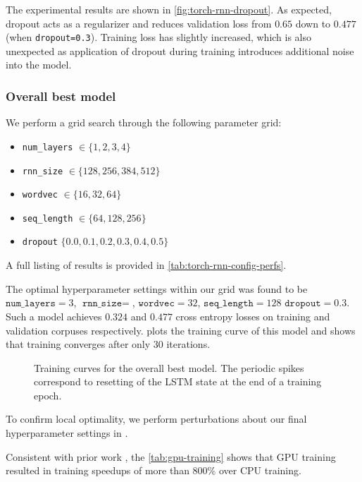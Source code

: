The experimental results are shown in \cref{fig:torch-rnn-dropout}. As
expected, dropout acts as a regularizer and reduces validation loss from $0.65$
down to $0.477$ (when \texttt{dropout=0.3}). Training loss has slightly
increased, which is also unexpected as application of dropout during training
introduces additional noise into the model.

\subsubsection{Overall best model}\label{sec:overall-best-model}

We perform a grid search through the following parameter grid:
\begin{itemize}
  \item \texttt{num\_layers} $\in \{1,2,3,4\}$
  \item \texttt{rnn\_size} $\in \{128, 256, 384, 512\}$
  \item \texttt{wordvec} $\in \{16, 32, 64\}$
  \item \texttt{seq\_length} $\in \{64,128,256\}$
  \item \texttt{dropout} $\{0.0, 0.1, 0.2, 0.3, 0.4, 0.5 \}$
\end{itemize}
A full listing of results is provided in \vref{tab:torch-rnn-config-perfs}.

The optimal hyperparameter settings within our grid was found to be
$\texttt{num\_layers}=3$, $\texttt{rnn\_size}=$, $\texttt{wordvec}=32$,
$\texttt{seq\_length}=128$ $\texttt{dropout}=0.3$. Such a model achieves
$0.324$ and $0.477$ cross entropy losses on training and validation corpuses
respectively.  plots the training curve
of this model and shows that training converges after only 30 iterations.

\begin{figure}[tb]
  \centering
  
  \caption{Training curves for the overall best model. The periodic spikes correspond
  to resetting of the LSTM state at the end of a training epoch.}
  \label{fig:torch-rnn-best-model-trace}
\end{figure}

To confirm local optimality, we perform perturbations about our final
hyperparameter settings in
.

Consistent with prior work \citep{sutskever2014sequence,kaiser2015neural}, the
\cref{tab:gpu-training} shows that GPU training resulted in training speedups
of more than $800\%$ over CPU training.

